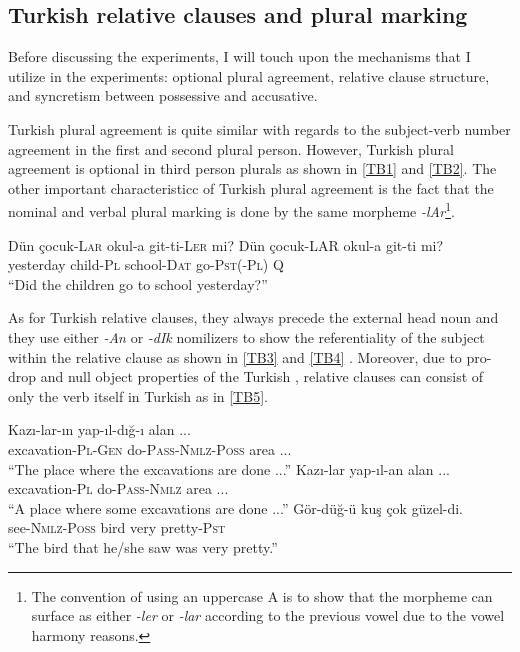 \documentclass[doc]{apa6}
\let\rmarkdownfootnote\footnote%
\def\footnote{\protect\rmarkdownfootnote}
\begin{document}
\hypertarget{turkish-relative-clauses-and-plural-marking}{%
\subsection{Turkish relative clauses and plural marking}\label{turkish-relative-clauses-and-plural-marking}}

Before discussing the experiments, I will touch upon the mechanisms that I utilize in the experiments: optional plural agreement, relative clause structure, and syncretism between possessive and accusative.

Turkish plural agreement is quite similar with regards to the subject-verb number agreement in the first and second plural person. However, Turkish plural agreement is optional in third person plurals as shown in \autoref{TB1} and \autoref{TB2}. The other important characteristicc of Turkish plural agreement is the fact that the nominal and verbal plural marking is done by the same morpheme \emph{-lAr}\footnote{The convention of using an uppercase A is to show that the morpheme can surface as either \textit{-ler} or \textit{-lar} according to the previous vowel due to the vowel harmony reasons.}.

\begin{exe}
\ex \label{TB1} Dün çocuk-\textsc{Lar} okul-a git-ti-\textsc{Ler} mi?
\ex 
\gll Dün çocuk-LAR okul-a git-ti mi?\\
yesterday child-\textsc{Pl} school-\textsc{Dat} go-\textsc{Pst}(-\textsc{Pl}) Q\\
\trans ``Did the children go to school yesterday?''
\label{TB2}
\end{exe}

As for Turkish relative clauses, they always precede the external head noun \autocites{Goksel2004}{Taylan2015} and they use either \emph{-An} or \emph{-dIk} nomilizers to show the referentiality of the subject within the relative clause as shown in \autoref{TB3} and \autoref{TB4} \autocite{Haig1997}. Moreover, due to pro-drop and null object properties of the Turkish \autocite[see][]{Ozturk2005}, relative clauses can consist of only the verb itself in Turkish as in \autoref{TB5}.

\begin{exe}
\ex \label{TB3}
\gll Kazı-lar-ın yap-ıl-dığ-ı alan ... \\
excavation-\textsc{Pl}-\textsc{Gen} do-\textsc{Pass}-\textsc{Nmlz}-\textsc{Poss} area ... \\
\glt ``The place where the excavations are done ...''
\ex \label{TB4}
\gll Kazı-lar yap-ıl-an alan ... \\
excavation-\textsc{Pl} do-\textsc{Pass}-\textsc{Nmlz} area ... \\
\glt ``A place where some excavations are done ...''
\ex \label{TB5}
\gll Gör-düğ-ü kuş çok güzel-di.\\
see-\textsc{Nmlz}-\textsc{Poss} bird very pretty-\textsc{Pst}\\
\glt ``The bird that he/she saw was very pretty.''
\end{exe}
\end{document}
